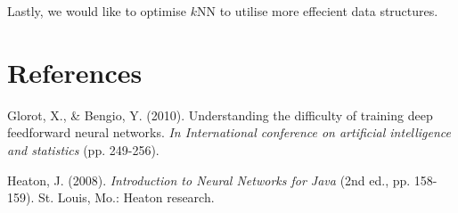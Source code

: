 \documentclass{article} %
\begin{document}
Lastly, we would like to optimise $k$NN to utilise more effecient data structures.



\section{References}
\small{
Glorot, X., \& Bengio, Y. (2010). Understanding the difficulty of training deep feedforward neural networks. \textit{In International conference on artificial intelligence and statistics} (pp. 249-256).

Heaton, J. (2008). \textit{Introduction to Neural Networks for Java} (2nd ed., pp. 158-159). St. Louis, Mo.: Heaton research.
}
\end{document}
